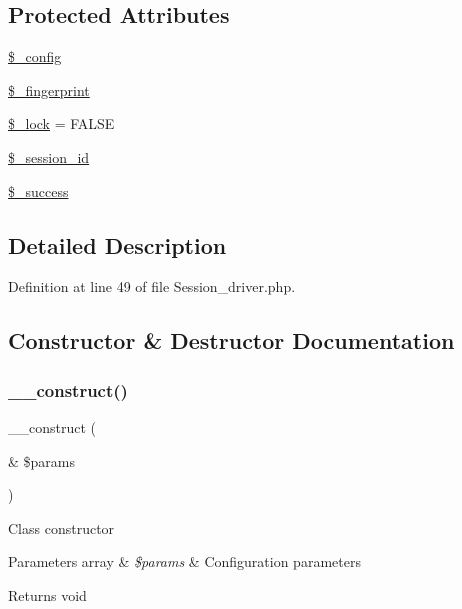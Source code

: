 \subsection*{Protected Attributes}
\begin{DoxyCompactItemize}
\item 
\mbox{\hyperlink{class_c_i___session__driver_a4d4ad4af1600438042f93a4492f8dbbe}{\$\+\_\+config}}
\item 
\mbox{\hyperlink{class_c_i___session__driver_ac926edb2847b6610e253be83270c2cc2}{\$\+\_\+fingerprint}}
\item 
\mbox{\hyperlink{class_c_i___session__driver_a1cfb8ce1d225fe600a6a034d685b8ff6}{\$\+\_\+lock}} = F\+A\+L\+SE
\item 
\mbox{\hyperlink{class_c_i___session__driver_a92023c94926d17b1f6705c8b1d35a103}{\$\+\_\+session\+\_\+id}}
\item 
\mbox{\hyperlink{class_c_i___session__driver_a0f7033d534d3f4ae0f5467368f724e7b}{\$\+\_\+success}}
\end{DoxyCompactItemize}


\subsection{Detailed Description}


Definition at line 49 of file Session\+\_\+driver.\+php.



\subsection{Constructor \& Destructor Documentation}
\mbox{\label{class_c_i___session__driver_ac1669c73d53d6f16cf5459a1e84d39c8}} 
\subsubsection{\texorpdfstring{\_\_construct()}{\_\_construct()}}
{\footnotesize\ttfamily \+\_\+\+\_\+construct (\begin{DoxyParamCaption}\item[{\&}]{\$params }\end{DoxyParamCaption})}

Class constructor


\begin{DoxyParams}[1]{Parameters}
array & {\em \$params} & Configuration parameters \\
\hline
\end{DoxyParams}
\begin{DoxyReturn}{Returns}
void 
\end{DoxyReturn}


